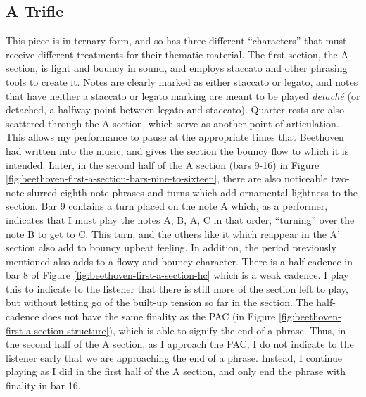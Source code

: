 \subsection{A Trifle}

This piece is in ternary form, and so has three different ``characters'' that must receive different treatments for their thematic material. The first section, the A section, is light and bouncy in sound, and employs staccato and other phrasing tools to create it. Notes are clearly marked as either staccato or legato, and notes that have neither a staccato or legato marking are meant to be played \textit{detaché} (or detached, a halfway point between legato and staccato). Quarter rests are also scattered through the A section, which serve as another point of articulation. This allows my performance to pause at the appropriate times that Beethoven had written into the music, and gives the section the bouncy flow to which it is intended. Later, in the second half of the A section (bars 9-16) in Figure \ref{fig:beethoven-first-a-section-bars-nine-to-sixteen}\autocite{Henle_1978}, there are also noticeable two-note slurred eighth note phrases and turns which add ornamental lightness to the section. Bar 9 contains a turn placed on the note A which, as a performer, indicates that I must play the notes A, B, A, C in that order, ``turning'' over the note B to get to C. This turn, and the others like it which reappear in the A' section also add to bouncy upbeat feeling. In addition, the period previously mentioned also adds to a flowy and bouncy character. There is a half-cadence in bar 8 of Figure \ref{fig:beethoven-first-a-section-hc}\autocite{Henle_1978} which is a weak cadence. I play this to indicate to the listener that there is still more of the section left to play, but without letting go of the built-up tension so far in the section. The half-cadence does not have the same finality as the PAC (in Figure \ref{fig:beethoven-first-a-section-structure}\autocite{Henle_1978}), which is able to signify the end of a phrase. Thus, in the second half of the A section, as I approach the PAC, I do not indicate to the listener early that we are approaching the end of a phrase. Instead, I continue playing as I did in the first half of the A section, and only end the phrase with finality in bar 16. 

